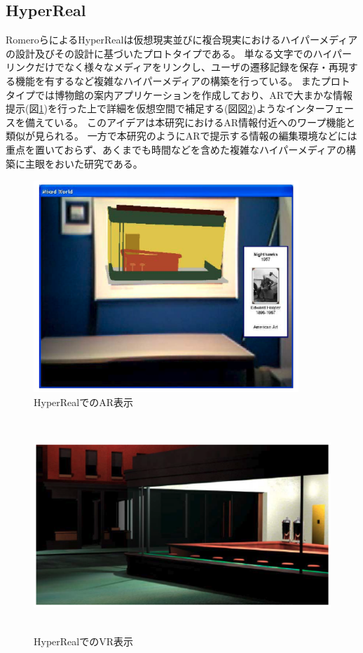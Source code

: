\subsection{HyperReal}
RomeroらによるHyperRealは\cite{10.1145/900051.900055}仮想現実並びに複合現実におけるハイパーメディアの設計及びその設計に基づいたプロトタイプである。
単なる文字でのハイパーリンクだけでなく様々なメディアをリンクし、ユーザの遷移記録を保存・再現する機能を有するなど複雑なハイパーメディアの構築を行っている。
またプロトタイプでは博物館の案内アプリケーションを作成しており、ARで大まかな情報提示(図\ref{fig:HyperReal_ar})を行った上で詳細を仮想空間で補足する(図図\ref{fig:HyperReal_vr})ようなインターフェースを備えている。
このアイデアは本研究におけるAR情報付近へのワープ機能と類似が見られる。
一方で本研究のようにARで提示する情報の編集環境などには重点を置いておらず、あくまでも時間などを含めた複雑なハイパーメディアの構築に主眼をおいた研究である。
\begin{figure}[H]
  \centering 
  \includegraphics[height=80mm]{images/HyperReal_ar.png}
  \caption{HyperRealでのAR表示} \label{fig:HyperReal_ar}
\end{figure}

\begin{figure}[H]
  \centering 
  \includegraphics[height=80mm]{images/HyperReal_vr.png}
  \caption{HyperRealでのVR表示} \label{fig:HyperReal_vr}
\end{figure}


